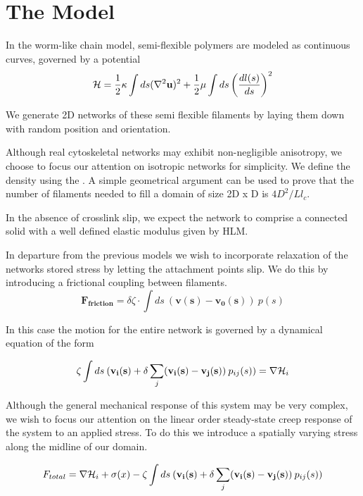 \documentclass[prb,11pt]{revtex4-1}
\begin{document}
\section{The Model}

In the worm-like chain model, semi-flexible polymers are modeled as continuous curves, governed by a potential 
\begin{equation}
{\cal H} =\frac{1}{2}\kappa \int ds(\nabla^2\mathbf{u})^2 + \frac{1}{2}\mu \int ds \left ( \frac{dl(s) }{ds} \right )^2
\end{equation}

We generate 2D networks of these semi flexible filaments by laying them down with random position and orientation.  

Although real cytoskeletal networks may exhibit non-negligible anisotropy, we choose to focus our attention on isotropic networks for simplicity.  We define the density using the . A simple geometrical argument can be used to prove that the number of filaments needed to fill a domain of size 2D x D is $4D^2/Ll_c$. 

In the absence of crosslink slip, we expect the network to comprise a connected solid with a well defined elastic modulus given by HLM.  

In departure from the previous models we wish to incorporate relaxation of the networks stored stress by letting the attachment points slip.  We do this by introducing a frictional coupling between filaments.
\begin{equation}
\mathbf{F_{friction}} = \delta \zeta \cdot \int ds \: (\mathbf{v(s)}-\mathbf{v_0(s)}) \: p(s)
\end{equation}

In this case the motion for the entire network is governed by a dynamical equation of the form

\begin{equation}
\zeta \int ds \: (\mathbf{v_i(s)} + \delta \sum _j(\mathbf{v_i(s)}-\mathbf{v_j(s)}) \: p_{ij}(s))= \nabla {\cal H}_i
\end{equation}

Although the general mechanical response of this system may be very complex, we wish to focus our attention on the linear order steady-state creep response of the system to an applied stress.  To do this we introduce a spatially varying stress along the midline of our domain.

\begin{equation}
F_{total}= \nabla {\cal H}_i + \sigma(x)-\zeta \int ds \: (\mathbf{v_i(s)} + \delta \sum _j(\mathbf{v_i(s)}-\mathbf{v_j(s)}) \: p_{ij}(s)) 
\end{equation}
\end{document}
